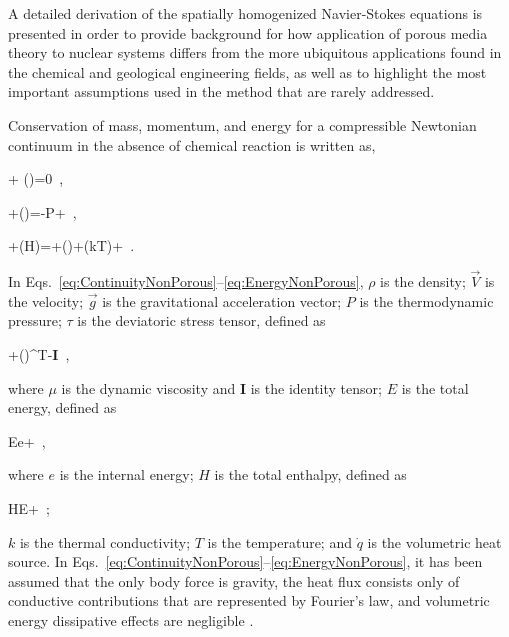 A detailed derivation of the spatially homogenized Navier-Stokes equations is presented in order to provide background for how application of porous media theory to nuclear systems differs from the more ubiquitous applications found in the chemical and geological engineering fields, as well as to highlight the most important assumptions used in the method that are rarely addressed. 

Conservation of mass, momentum, and energy for a compressible Newtonian continuum in the absence of chemical reaction is written as,

\beq
\label{eq:ContinuityNonPorous}
 + \nabla\cdot(\rho{})=0\ ,
\eeq

\beq
\label{eq:NSFullForm}
+\nabla\cdot(\rho{})=\rho{}-\nabla P+\nabla\cdot\tau\ ,
\eeq

\beq
\label{eq:EnergyNonPorous}
+\nabla\cdot(\rho H)=\rho {}\cdot{}+\nabla\cdot(\tau)+\nabla\cdot(k\nabla T)+\ .
\eeq

\noindent In Eqs.\ \eqref{eq:ContinuityNonPorous}--\eqref{eq:EnergyNonPorous}, \(\rho\) is the density; \(\vec{V}\) is the velocity; \(\vec{g}\) is the gravitational acceleration vector; \(P\) is the thermodynamic pressure; \(\tau\) is the deviatoric stress tensor, defined as

\beq
\label{eq:TauDef}
\tau\equiv\mu\left\lbrack\nabla {}+(\nabla {})^T\right\rbrack-\nabla\cdot{}\textbf{I}\ ,
\eeq

\noindent where \(\mu\) is the dynamic viscosity and \(\textbf{I}\) is the identity tensor; \(E\) is the total energy, defined as

\beq
\label{eq:TotalEnergyDef}
E\equiv e+\cdot{}\ ,
\eeq

\noindent where \(e\) is the internal energy; \(H\) is the total enthalpy, defined as

\beq
\label{eq:TotalEnthalpyDef}
H\equiv E+\ ;
\eeq

\noindent \(k\) is the thermal conductivity; \(T\) is the temperature; and \(\dot{q}\) is the volumetric heat source. In Eqs.\ \eqref{eq:ContinuityNonPorous}--\eqref{eq:EnergyNonPorous}, it has been assumed that the only body force is gravity, the heat flux consists only of conductive contributions that are represented by Fourier's law, and volumetric energy dissipative effects are negligible \cite{batchelor}.

